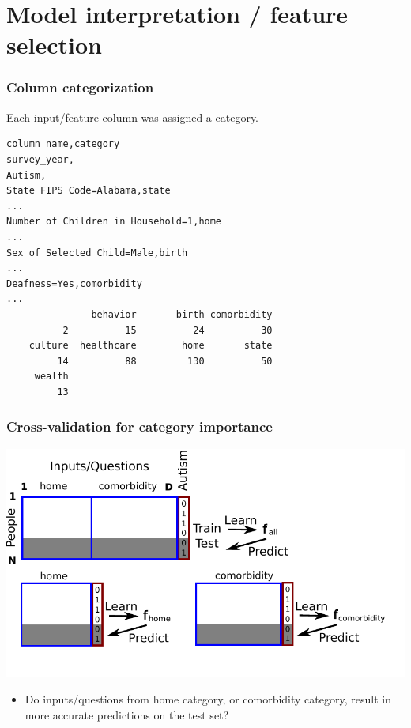 \documentclass{beamer}
\begin{document}
\section{Model interpretation / feature selection}

\begin{frame}[fragile]
  \frametitle{Column categorization}
Each input/feature column was assigned a category.
\begin{verbatim}
column_name,category
survey_year,
Autism,
State FIPS Code=Alabama,state
...
Number of Children in Household=1,home
...
Sex of Selected Child=Male,birth
...
Deafness=Yes,comorbidity
...
               behavior       birth comorbidity 
          2          15          24          30 
    culture  healthcare        home       state 
         14          88         130          50 
     wealth 
         13 
\end{verbatim}
\end{frame}

\begin{frame}
  \frametitle{Cross-validation for category importance}
  \includegraphics[width=\textwidth]{drawing-cv-feature-sets.pdf}

  \begin{itemize}
  \item Do inputs/questions from home category, or comorbidity
    category, result in more accurate predictions on the test set?
  \end{itemize}
\end{frame}
\end{document}
